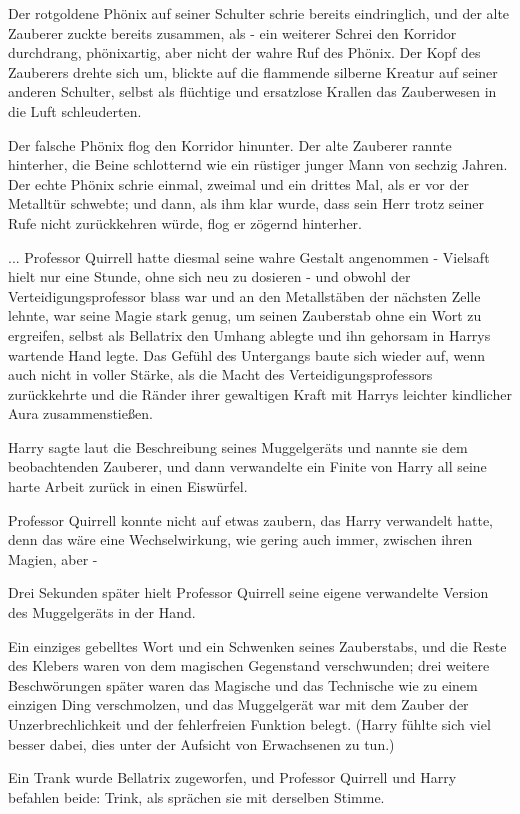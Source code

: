 Der rotgoldene Phönix auf seiner Schulter schrie bereits eindringlich, und der
alte Zauberer zuckte bereits zusammen, als - ein weiterer Schrei den Korridor
durchdrang, phönixartig, aber nicht der wahre Ruf des Phönix. Der Kopf des
Zauberers drehte sich um, blickte auf die flammende silberne Kreatur auf seiner
anderen Schulter, selbst als flüchtige und ersatzlose Krallen das Zauberwesen in
die Luft schleuderten.

Der falsche Phönix flog den Korridor hinunter. Der alte Zauberer rannte
hinterher, die Beine schlotternd wie ein rüstiger junger Mann von sechzig
Jahren. Der echte Phönix schrie einmal, zweimal und ein drittes Mal, als er vor
der Metalltür schwebte; und dann, als ihm klar wurde, dass sein Herr trotz
seiner Rufe nicht zurückkehren würde, flog er zögernd hinterher.

... Professor Quirrell hatte diesmal seine wahre Gestalt angenommen - Vielsaft
hielt nur eine Stunde, ohne sich neu zu dosieren - und obwohl der
Verteidigungsprofessor blass war und an den Metallstäben der nächsten Zelle
lehnte, war seine Magie stark genug, um seinen Zauberstab ohne ein Wort zu
ergreifen, selbst als Bellatrix den Umhang ablegte und ihn gehorsam in Harrys
wartende Hand legte. Das Gefühl des Untergangs baute sich wieder auf, wenn auch
nicht in voller Stärke, als die Macht des Verteidigungsprofessors zurückkehrte
und die Ränder ihrer gewaltigen Kraft mit Harrys leichter kindlicher Aura
zusammenstießen.

Harry sagte laut die Beschreibung seines Muggelgeräts und nannte sie dem
beobachtenden Zauberer, und dann verwandelte ein Finite von Harry all seine
harte Arbeit zurück in einen Eiswürfel.

Professor Quirrell konnte nicht auf etwas zaubern, das Harry verwandelt hatte,
denn das wäre eine Wechselwirkung, wie gering auch immer, zwischen ihren Magien,
aber -

Drei Sekunden später hielt Professor Quirrell seine eigene verwandelte Version
des Muggelgeräts in der Hand.

Ein einziges gebelltes Wort und ein Schwenken seines Zauberstabs, und die Reste
des Klebers waren von dem magischen Gegenstand verschwunden; drei weitere
Beschwörungen später waren das Magische und das Technische wie zu einem einzigen
Ding verschmolzen, und das Muggelgerät war mit dem Zauber der Unzerbrechlichkeit
und der fehlerfreien Funktion belegt. (Harry fühlte sich viel besser dabei, dies
unter der Aufsicht von Erwachsenen zu tun.)

Ein Trank wurde Bellatrix zugeworfen, und Professor Quirrell und Harry befahlen
beide: \glqq{}Trink\grqq{}, als sprächen sie mit derselben Stimme.


